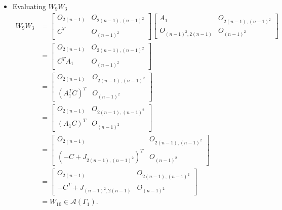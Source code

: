 \begin{itemize}
    \item Evaluating $W_9W_3$
    \begin{align*}
        W_9W_3
        &=\begin{bmatrix}
            O_{2(n-1)} & O_{2(n-1), (n-1)^2} \\
            C^T & O_{(n-1)^2}
        \end{bmatrix}\begin{bmatrix}
            A_1 & O_{2(n-1), (n-1)^2} \\
            O_{(n-1)^2, 2(n-1)} & O_{(n-1)^2}
        \end{bmatrix} \\
        &= \begin{bmatrix}
            O_{2(n-1)} & O_{2(n-1), (n-1)^2} \\
            C^TA_1 & O_{(n-1)^2}
        \end{bmatrix}\\
        &= \begin{bmatrix}
            O_{2(n-1)} & O_{2(n-1), (n-1)^2} \\
           (A_1^TC)^T & O_{(n-1)^2}
        \end{bmatrix}\\
        &= \begin{bmatrix}
            O_{2(n-1)} & O_{2(n-1), (n-1)^2} \\
            (A_1C)^T & O_{(n-1)^2}
        \end{bmatrix}\\
        &= \begin{bmatrix}
            O_{2(n-1)} & O_{2(n-1), (n-1)^2} \\
            (-C + J_{2(n-1),(n-1)^2})^T & O_{(n-1)^2}
        \end{bmatrix}\\
        &= \begin{bmatrix}
            O_{2(n-1)} & O_{2(n-1), (n-1)^2} \\
            -C^T + J_{(n-1)^2, 2(n-1)} & O_{(n-1)^2}
        \end{bmatrix}\\
        &= W_{10}\in\mathcal{A}(\Gamma_1).
    \end{align*}
    

\end{itemize}
